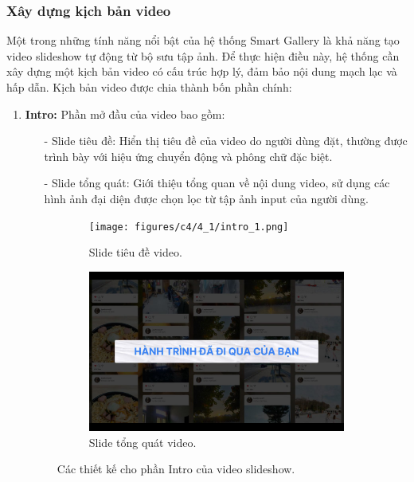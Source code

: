 \subsubsection{Xây dựng kịch bản video}

Một trong những tính năng nổi bật của hệ thống Smart Gallery là khả năng tạo video slideshow tự động từ bộ sưu tập ảnh. Để thực hiện điều này, hệ thống cần xây dựng một kịch bản video có cấu trúc hợp lý, đảm bảo nội dung mạch lạc và hấp dẫn. Kịch bản video được chia thành bốn phần chính:

\begin{enumerate}
    \item \textbf{Intro:} Phần mở đầu của video bao gồm:
    \begin{itemize}
        \item[-] Slide tiêu đề: Hiển thị tiêu đề của video do người dùng đặt, thường được trình bày với hiệu ứng chuyển động và phông chữ đặc biệt.
        \item[-] Slide tổng quát: Giới thiệu tổng quan về nội dung video, sử dụng các hình ảnh đại diện được chọn lọc từ tập ảnh input của người dùng.
    \end{itemize}
    
    \begin{figure}[H]
        \centering
        \begin{subfigure}{0.48\textwidth}
            \texttt{[image: figures/c4/4\_1/intro\_1.png]} 
            \caption{Slide tiêu đề video.}
        \end{subfigure}
        \hfill
        \begin{subfigure}{0.48\textwidth}
            \includegraphics[width=1\linewidth]{figures/c4/4_1/intro_2.jpg} 
            \caption{Slide tổng quát video.}
        \end{subfigure}
        \caption{Các thiết kế cho phần Intro của video slideshow.}
        \label{fig:video-intro-design}
    \end{figure}
    

\end{enumerate}
